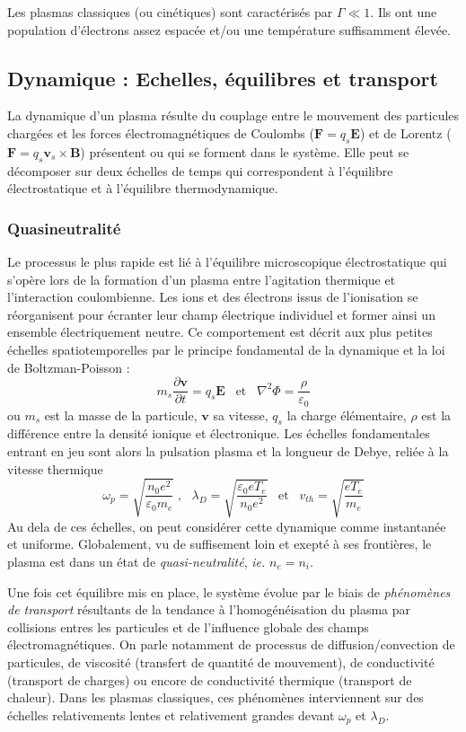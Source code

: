 			Les plasmas classiques (ou cinétiques) sont caractérisés par
			$\Gamma\ll 1$. Ils ont une population d'électrons assez espacée et/ou une
			température suffisamment élevée.
			
		\subsection{Dynamique : Echelles, équilibres et transport}
		La dynamique d'un plasma résulte du couplage entre le mouvement des
		particules chargées et les forces électromagnétiques de Coulombs ($\mathbf
		F=q_s\mathbf E$) et de Lorentz ($\mathbf F=q_s\mathbf v_s\times\mathbf B$)
		présentent ou qui se forment dans le système.
		Elle peut se décomposer sur deux échelles de temps qui correspondent à l'équilibre électrostatique
		et à l'équilibre thermodynamique.
			\subsubsection{Quasineutralité}
			Le processus le plus rapide est lié à
			l'équilibre microscopique électrostatique qui s'opère lors de la formation
			d'un plasma entre l'agitation thermique et l'interaction coulombienne. Les
			ions et des électrons issus de l'ionisation se réorganisent pour écranter
			leur champ électrique individuel et former ainsi un ensemble électriquement neutre. 
			Ce comportement est décrit aux plus petites échelles spatiotemporelles par
			le principe fondamental de la dynamique et la loi de Boltzman-Poisson :
			$$m_s\frac{\partial \mathbf{v}}{\partial t}=q_s\mathbf E
			\;\;\;\text{et}\;\;\;\nabla^2\Phi=\frac{\rho}{\varepsilon_0}$$ ou
			$m_s$ est la masse de la particule, $\mathbf{v}$ sa vitesse, $q_s$ la
			charge élémentaire, $\rho$ est la différence entre la densité ionique et
			électronique.
			Les échelles fondamentales entrant en jeu sont alors la pulsation plasma et
			la longueur de Debye, reliée à la vitesse thermique 
			$$\omega_p=\sqrt{\frac{n_0e^2}{\varepsilon_0
			m_e}}\;\text{,}\;\;\;\lambda_D=\sqrt{\frac{\varepsilon_0
			eT_e}{n_0e^2}}\;\;\;\text{et}\;\;\;v_{th}=\sqrt{\frac{eT_e}{m_e}}$$
			Au dela de ces échelles, on peut considérer cette dynamique comme instantanée
			et uniforme. Globalement, vu de suffisement loin et exepté à ses frontières,
			le plasma est dans un état de \emph{quasi-neutralité}, \emph{ie.} $n_e=n_i$.
			
			Une fois cet équilibre mis en place, le système évolue par le biais de
			\emph{phénomènes de transport} résultants de la tendance à
			l'homogénéisation du plasma par collisions entres les particules et de
			l'influence globale des champs électromagnétiques. On parle notamment de
			processus de diffusion/convection de particules, de viscosité (transfert de
			quantité de mouvement), de conductivité (transport de charges) ou encore de
			conductivité thermique (transport de chaleur). Dans les plasmas
			classiques, ces phénomènes interviennent sur des échelles relativements
			lentes et relativement grandes devant $\omega_p$ et $\lambda_D$.

